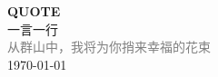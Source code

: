 \vspace*{\fill}
\begin{center}
    \textcolor{blue!50}{\Huge\textbf{QUOTE}} \\[1em]
    \textcolor{blue!60!pink}{\Large 一言一行} \\[2em]
    \textcolor{gray}{\large 从群山中，我将为你捎来幸福的花束} \\[1em]
    \today
\end{center}
\vspace*{\fill}
\clearpage


\clearpage

\clearpage



